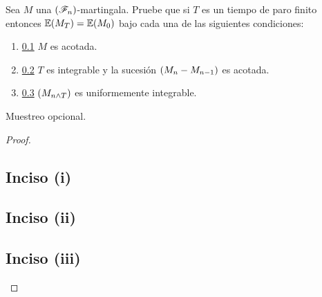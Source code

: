 \begin{problema}
Sea $M$ una $\left( \mathscr{F}_n\right) $-martingala. Pruebe que si $T$ es un tiempo de paro finito entonces $\mathbb{E}\! \left( M_T \right)=\mathbb{E}\! \left( M_0 \right)$ bajo cada una de las siguientes condiciones:
\begin{enumerate}
    \item \ref{problema3_1:inciso1}
        $M$ es acotada.
    \item \ref{problema3_1:inciso2}
        $T$ es integrable y la sucesi\'on $\left( M_n-M_{n-1}\right) $ es acotada.
    \item \ref{problema3_1:inciso3}
        $\left( M_{n\wedge T}\right) $ es uniformemente integrable. 
\end{enumerate}

 Muestreo opcional.
\end{problema}

\begin{proof}
    \subsection{Inciso (i)}     \label{problema3_1:inciso1}
    
    \newpage
    
    \subsection{Inciso (ii)}    \label{problema3_1:inciso2}
    
    \newpage
        
    \subsection{Inciso (iii)}    \label{problema3_1:inciso3}
    
    \newpage
\end{proof}